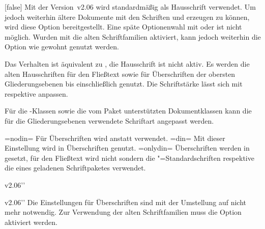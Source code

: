 %
\begin{Declaration}[v2.06]{}[false]
\printdeclarationlist%
%
Mit der Version~v2.06 wird standardmäßig \OpenSans als Hausschrift verwendet. 
Um jedoch weiterhin ältere Dokumente mit den Schriften \Univers und \DIN 
erzeugen zu können, wird diese Option bereitgestellt.
 Eine späte Optionenwahl mit  oder  ist 
nicht möglich. Wurden mit  die alten Schriftfamilien 
aktiviert, kann jedoch weiterhin die Option  wie gewohnt 
genutzt werden.
%
\begin{DeclarationValues}
\itemvalfalse
  Das Verhalten ist äquivalent zu , die Hausschrift ist 
  nicht aktiv.
\itemvaltrue*
  Es werden die alten Hausschriften \Univers für den Fließtext sowie \DIN für 
  Überschriften der obersten Gliederungsebenen bis einschließlich 
   genutzt. Die Schriftstärke lässt sich mit 
   respektive  anpassen.
\end{DeclarationValues}
%
Für die \TUDScript-Klassen sowie die vom Paket  
unterstützten Dokumentklassen kann die für die Gliederungsebenen verwendete 
Schriftart angepasst werden.
%
\begin{DeclarationValues}
\itemval=nodin=
  Für Überschriften wird \Univers anstatt \DIN verwendet.
\itemval=din=
  Mit dieser Einstellung wird \DIN in Überschriften genutzt. 
\itemval=onlydin=
  Überschriften werden in \DIN gesetzt, für den Fließtext wird nicht \Univers 
  sondern die "=Standardschriften respektive die eines geladenen 
  Schriftpaketes verwendet.
\end{DeclarationValues}
\end{Declaration}

\begin{Obsolete}{v2.06}{}''
\begin{Obsolete}{v2.06}{}''
\printdeclarationlist%
%
Die Einstellungen für Überschriften sind mit der Umstellung auf \OpenSans nicht 
mehr notwendig. Zur Verwendung der alten Schriftfamilien muss die Option 
 aktiviert werden.
\end{Obsolete}
\end{Obsolete}

